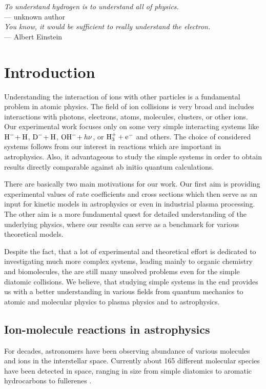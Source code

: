 \begin{flushright}
\textsl{To understand hydrogen is to understand all of physics.}\\
 \medskip{}
 --- unknown author \\
\bigskip{}
\textsl{You know, it would be sufficient to really understand the electron.}\\
 \medskip{}
 --- Albert Einstein
\par\end{flushright}

\bigskip{}
\begingroup
\let\clearpage\relax
\let\cleardoublepage\relax


\chapter{Introduction}

\label{ch:Introduction}
Understanding the interaction of ions with other particles is a
fundamental problem in atomic physics. The field of ion collisions
is very broad and includes interactions with photons, electrons,
atoms, molecules, clusters, or other ions. Our experimental work
focuses only on some very simple interacting systems like
${\text{H}^-\!}+{\text{H}}$,
${\text{D}^-\!}+{\text{H}}$, ${\text{OH}^-\!}+h\nu$, or ${\text{H}^+_3}+{\text{e}^-}$ and others. The
choice of considered systems follows from our interest in reactions
which are important in astrophysics. Also, it advantageous to study
the simple systems in order to obtain results directly comparable
against ab initio quantum calculations.

There are basically two main motivations for our work. Our first
aim is providing experimental values of rate coefficients and
cross sections which then serve as an input for kinetic models
in astrophysics or even in industrial plasma processing. The
other aim is a more fundamental quest for detailed understanding
of the underlying physics, where our results can serve as a benchmark
for various theoretical models.

Despite the fact, that a lot of experimental and theoretical effort
is dedicated to investigating much more complex systems, leading
mainly to organic chemistry and biomolecules, the are still many
unsolved problems even for the simple diatomic collisions. We
believe, that studying simple systems in the end provides
us with a better understanding in various fields from quantum mechanics
to atomic and molecular physics to plasma physics and to astrophysics.

\section{Ion-molecule reactions in astrophysics}
For decades, astronomers have been observing abundance of
various molecules and ions in the interstellar space. Currently
about 165 different molecular species have been detected in space, ranging
in size from simple diatomics to aromatic hydrocarbons to fullerenes 
\citep{muller2001,muller2005,cdms}.

